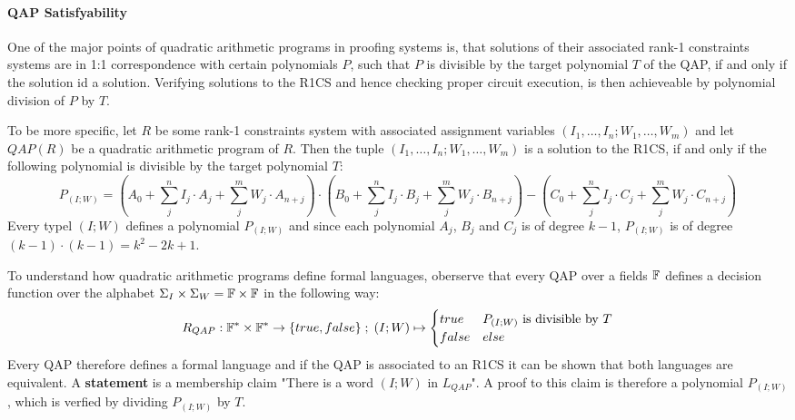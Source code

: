\paragraph{QAP Satisfyability} One of the major points of quadratic arithmetic programs in proofing systems is, that solutions of their associated rank-1 constraints systems are in 1:1 correspondence with certain polynomials $P$, such that $P$ is divisible by the target polynomial $T$ of the QAP, if and only if the solution id a solution. Verifying solutions to the R1CS and hence checking proper circuit execution, is then achieveable by polynomial division of $P$ by $T$.

To be more specific, let $R$ be some rank-1 constraints system with associated assignment variables $(I_1,\ldots,I_n; W_1,\ldots, W_m)$ and let $QAP(R)$ be a quadratic arithmetic program of $R$. Then the tuple $(I_1,\ldots,I_n; W_1,\ldots, W_m)$ is a solution to the R1CS, if and only if the following polynomial is divisible by the target polynomial $T$:
\begin{equation}
P_{(I;W)} = \scriptstyle \left(A_0 + \sum_{j}^n I_j\cdot A_j + \sum_{j}^m W_j\cdot A_{n+j} \right) \cdot \left(B_0 + \sum_{j}^n I_j\cdot B_j + \sum_{j}^m W_j\cdot B_{n+j} \right) 
-\left(C_0 + \sum_{j}^n I_j\cdot C_j + \sum_{j}^m W_j\cdot C_{n+j} \right)
\end{equation}
Every typel $(I;W)$ defines a polynomial $P_{(I;W)}$ and since each polynomial $A_j$, $B_j$ and $C_j$ is of degree $k-1$, $P_{(I;W)}$ is of degree $(k-1)\cdot (k-1)= k^2 -2k +1$. 

To understand how quadratic arithmetic programs define formal languages, oberserve that every QAP over a fields $\mathbb{F}$ defines a decision function over the alphabet $\Sigma_I \times \Sigma_W = \mathbb{F} \times \mathbb{F}$ in the following way:
\begin{equation}
R_{QAP} : \mathbb{F}^* \times \mathbb{F}^* \to \{true, false\}\;;\;
(I;W) \mapsto
\begin{cases}
true & P_{(I;W)} \text{ is divisible by } T\\
false & else
\end{cases}
\end{equation}
Every QAP therefore defines a formal language and if the QAP is associated to an R1CS it can be shown that both languages are equivalent. A \textbf{statement} is a membership claim "There is a word $(I;W)$ in $L_{QAP}$". A proof to this claim is therefore a polynomial $P_{(I;W)}$, which is verfied by dividing $P_{(I;W)}$ by $T$.

